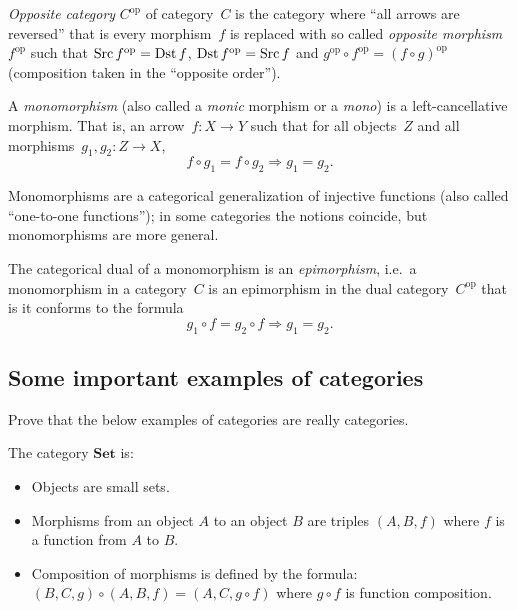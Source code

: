 \begin{defn}
\emph{Opposite category} $C^{\operatorname{op}}$ of category~$C$ is the category where
``all arrows are reversed'' that is every morphism~$f$ is replaced with so called
\emph{opposite morphism}~$f^{\operatorname{op}}$ such that
$\operatorname{Src} f^{\operatorname{op}} = \operatorname{Dst} f$, $\operatorname{Dst} f^{\operatorname{op}} = \operatorname{Src} f$ and
$g^{\operatorname{op}}\circ f^{\operatorname{op}} = (f\circ g)^{\operatorname{op}}$
(composition taken in the ``opposite order'').
\end{defn}

\begin{defn}
A \emph{monomorphism} (also called a \emph{monic} morphism or a \emph{mono}) is a left-cancellative morphism. That is, an arrow~$f\colon X\to Y$ such that for all objects~$Z$ and all morphisms~$g_1,g_2\colon Z\to X$,
\[ f\circ g_1=f\circ g_2\Rightarrow g_1=g_2. \]
\end{defn}

Monomorphisms are a categorical generalization of injective functions (also called ``one-to-one functions''); in some categories the notions coincide, but monomorphisms are more general.

\begin{defn}
The categorical dual of a monomorphism is an \emph{epimorphism}, i.e.\ a monomorphism in a category~$C$ is an epimorphism in the dual category~$C^{\operatorname{op}}$ that is it
conforms to the formula
\[ g_1\circ f=g_2\circ f\Rightarrow g_1=g_2. \]
\end{defn}

\subsection{Some important examples of categories}
\begin{xca}
Prove that the below examples of categories are really categories.\end{xca}
\begin{defn}
The category $\mathbf{Set}$ is:
\begin{itemize}
\item Objects are small sets.
\item Morphisms from an object $A$ to an object $B$ are triples $(A,B,f)$
where $f$ is a function from $A$ to $B$.
\item Composition of morphisms is defined by the formula: $(B,C,g)\circ(A,B,f)=(A,C,g\circ f)$
where $g\circ f$ is function composition.
\end{itemize}
\end{defn}

